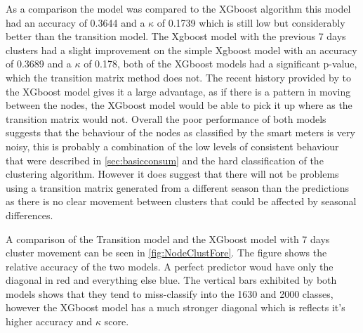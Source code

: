 As a comparison the model was compared to the XGboost algorithm this model had an accuracy of 0.3644 and a $\kappa$ of 0.1739 which is still low but considerably better than the transition model. The Xgboost model with the previous 7 days clusters had a slight improvement on the simple Xgboost model with an accuracy of 0.3689 and a $\kappa$ of 0.178, both of the XGboost models had a significant p-value, which the transition matrix method does not. The recent history provided by to the XGboost model gives it a large advantage, as if there is a pattern in moving between the nodes, the XGboost model would be able to pick it up where as the transition matrix would not. Overall the poor performance of both models suggests that the behaviour of the nodes as classified by the smart meters is very noisy, this is probably a combination of the low levels of consistent behaviour that were described in \ref{sec:basicconsum} and the hard classification of the clustering algorithm. However it does suggest that there will not be problems using a transition matrix generated from a different season than the predictions as there is no clear movement between clusters that could be affected by seasonal differences. 

A comparison of the Transition model and the XGboost model with 7 days cluster movement can be seen in \ref{fig:NodeClustFore}. The figure shows the relative accuracy of the two models. A perfect predictor woud have only the diagonal in red and everything else blue. The vertical bars exhibited by both models shows that they tend to miss-classify into the 1630 and 2000 classes, however the XGboost model has a much stronger diagonal which is reflects it's higher accuracy and $\kappa$ score.


